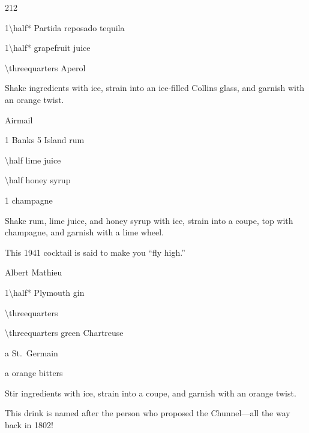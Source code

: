 \begin{Cocktail}[\PDT]{212}
  \begin{Ingredients}
    \item \SI{1\half*}{\oz} Partida reposado tequila
    \item \SI{1\half*}{\oz} grapefruit juice
    \item \SI{\threequarters}{\oz} Aperol
  \end{Ingredients}
  
  \begin{Instructions}
	Shake ingredients with ice, strain into an ice-filled Collins glass, and
    garnish with an orange twist.
  \end{Instructions}
\end{Cocktail}

\begin{Cocktail}[\PDT*]{Airmail}
  \begin{Ingredients}
    \item \SI{1}{\oz} Banks 5 Island rum\footnotemark[1]
    \item \SI{\half}{\oz} lime juice
    \item \SI{\half}{\oz} honey syrup
    \item \SI{1}{\oz} champagne
  \end{Ingredients}
  
  \begin{Instructions}
	Shake rum, lime juice, and honey syrup with ice, strain into a coupe, top
    with champagne, and garnish with a lime wheel.

    This 1941 cocktail is said to make you ``fly high.''
  \end{Instructions}
\end{Cocktail}

\begin{Cocktail}[\PDT*]{Albert Mathieu}
  \begin{Ingredients}
    \item \SI{1\half*}{\oz} Plymouth gin
    \item \SI{\threequarters}{\oz} \Lillet
    \item \SI{\threequarters}{\oz} green Chartreuse
    \item a \si{\dash} St.\ Germain
    \item a \si{\dash} orange bitters
  \end{Ingredients}
  
  \begin{Instructions}
	Stir ingredients with ice, strain into a coupe, and garnish with an orange
    twist.

    This drink is named after the person who proposed the Chunnel---all the way
    back in 1802!
  \end{Instructions}
\end{Cocktail}

